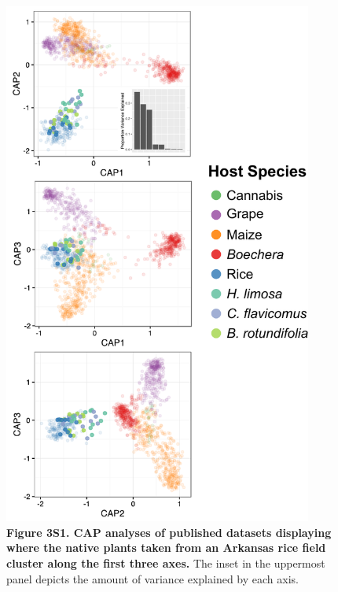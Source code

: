 \newpage

\begin{figure}[h]
\centering
\includegraphics[width=4in]{Figures/figure2_s1}
\captionsetup{labelformat=empty}
\caption[Figure 3S1]{\textbf{Figure 3S1. CAP analyses of published datasets displaying where the native plants taken from an Arkansas rice field cluster along the first three axes.} The inset in the uppermost panel depicts the amount of variance explained by each axis.}
\label{Figure 3S1}
\end{figure}

\newpage

